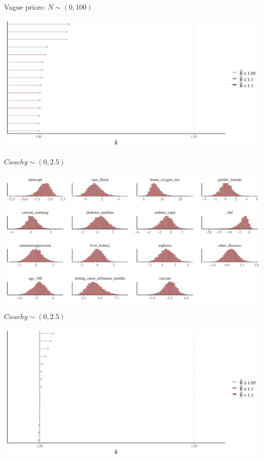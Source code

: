 \documentclass[ignorenonframetext,a4paper]{beamer}
\begin{document}
\begin{frame}{Vague priors: \(N \sim \left( 0, 100 \right)\)}

\includegraphics{DB_presentation_case_study_files/figure-beamer/unnamed-chunk-28-1.pdf}

\end{frame}

\begin{frame}{\(Cauchy \sim \left( 0, 2.5 \right)\)}

\includegraphics{DB_presentation_case_study_files/figure-beamer/unnamed-chunk-29-1.pdf}

\end{frame}

\begin{frame}{\(Cauchy \sim \left( 0, 2.5 \right)\)}

\includegraphics{DB_presentation_case_study_files/figure-beamer/unnamed-chunk-30-1.pdf}

\end{frame}
\end{document}
